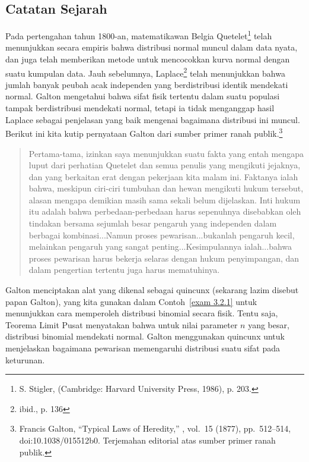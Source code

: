 \subsection*{Catatan Sejarah}
Pada pertengahan tahun 1800-an, matematikawan Belgia Quetelet\footnote{S. Stigler,  (Cambridge: Harvard University Press,
1986), p. 203.} telah menunjukkan secara empiris bahwa distribusi normal muncul dalam data nyata,
dan juga telah memberikan metode untuk mencocokkan kurva normal dengan suatu kumpulan data.
Jauh sebelumnya, Laplace\footnote{ibid., p. 136} telah menunjukkan bahwa
jumlah banyak peubah acak independen yang berdistribusi identik mendekati normal.
Galton mengetahui bahwa sifat fisik tertentu dalam suatu populasi tampak
berdistribusi mendekati normal, tetapi ia tidak menganggap hasil Laplace sebagai penjelasan yang
baik mengenai bagaimana distribusi ini muncul.  Berikut ini kita kutip pernyataan Galton dari
sumber primer ranah publik.\footnote{Francis Galton, ``Typical Laws of Heredity,''
, vol.~15 (1877), pp.~512--514, doi:10.1038/015512b0. Terjemahan editorial
atas sumber primer ranah publik.}
\begin{quote}
Pertama-tama, izinkan saya menunjukkan suatu fakta yang entah mengapa luput dari perhatian
Quetelet dan semua penulis yang mengikuti jejaknya, dan yang berkaitan erat dengan pekerjaan kita
malam ini.  Faktanya ialah bahwa, meskipun ciri-ciri tumbuhan dan hewan mengikuti hukum tersebut,
alasan mengapa demikian masih sama sekali belum dijelaskan.  Inti hukum itu adalah bahwa
perbedaan-perbedaan harus sepenuhnya disebabkan oleh tindakan bersama sejumlah besar pengaruh
 yang independen dalam berbagai kombinasi...Namun proses pewarisan...bukanlah pengaruh
kecil, melainkan pengaruh yang sangat penting...Kesimpulannya ialah...bahwa proses pewarisan harus
bekerja selaras dengan hukum penyimpangan, dan dalam pengertian tertentu juga harus mematuhinya.
\end{quote}
\par
Galton menciptakan alat yang dikenal sebagai quincunx (sekarang lazim disebut
papan Galton), yang kita gunakan dalam Contoh~\ref{exam 3.2.1} untuk
menunjukkan cara memperoleh distribusi binomial secara fisik.  Tentu saja, Teorema Limit Pusat
menyatakan bahwa untuk nilai parameter $n$ yang besar, distribusi binomial mendekati normal.
Galton menggunakan quincunx untuk menjelaskan bagaimana pewarisan memengaruhi distribusi suatu
sifat pada keturunan.
